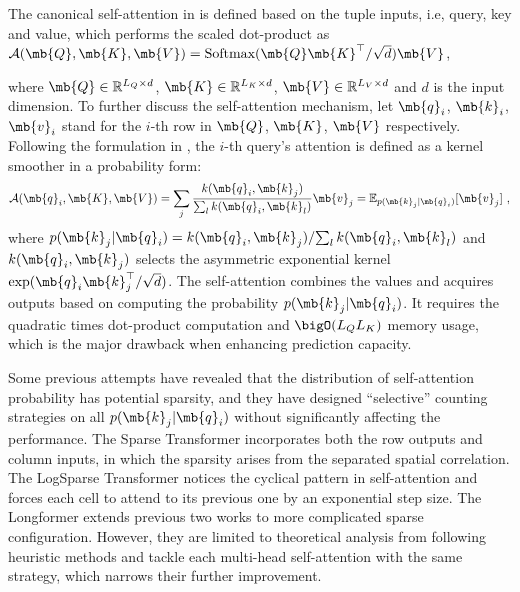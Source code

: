 The canonical self-attention in \cite{vaswani2017attention} is defined based on the tuple inputs, i.e, query, key and value, which performs the scaled dot-product as $\mathcal{A} (\mb{Q}, \mb{K}, \mb{V}) = \textrm{Softmax} ({\mb{Q}\mb{K}^{\top}}/{\sqrt{d}})\mb{V}$,
\iffalse
\begin{equation}\label{eq:method.origin.Attention}
    \mathcal{A} (\mb{Q}, \mb{K}, \mb{V}) = \textrm{Softmax} (\frac{\mb{Q}\mb{K}^{\top}}{\sqrt{d}})\mb{V} \qquad,
\end{equation}
\fi
where $\mb{Q} \in \mathbb{R}^{L_Q \times d}$, $\mb{K} \in \mathbb{R}^{L_K \times d}$, $\mb{V} \in \mathbb{R}^{L_V \times d}$ and $d$ is the input dimension.
To further discuss the self-attention mechanism, let $\mb{q}_{i}$, $\mb{k}_{i}$, $\mb{v}_{i}$ stand for the $i$-th row in $\mb{Q}$, $\mb{K}$, $\mb{V}$ respectively. Following the formulation in \cite{tsai2019transformer}, the $i$-th query's attention is defined as a kernel smoother in a probability form:
\begin{equation}\label{eq:method.prob.Attention}
    \mathcal{A} (\mb{q}_i, \mb{K}, \mb{V}) = \sum_{j} \frac{k(\mb{q}_i, \mb{k}_j)}{\sum_{l} k(\mb{q}_i, \mb{k}_l)} \mb{v}_{j} = \mathbb{E}_{p(\mb{k}_j|\mb{q}_i)} [\mb{v}_j] ~,
\end{equation}
where $p(\mb{k}_j|\mb{q}_i) = {k(\mb{q}_i, \mb{k}_j)}/{\sum_{l} k(\mb{q}_i, \mb{k}_l)}$ and $k(\mb{q}_i, \mb{k}_j)$ selects the asymmetric
exponential kernel $\exp ({\mb{q}_i \mb{k}_j^{\top}}/{\sqrt{d}})$.
The self-attention combines the values and acquires outputs based on computing the probability $p(\mb{k}_j|\mb{q}_i)$. It requires the quadratic times dot-product computation and $\bigO(L_Q L_K)$ memory usage, which is the major drawback when enhancing prediction capacity.

Some previous attempts have revealed that the distribution of self-attention probability has potential sparsity, and they have designed ``selective'' counting strategies on all $p(\mb{k}_j|\mb{q}_i)$ without significantly affecting the performance.
The Sparse Transformer \cite{child2019generating} incorporates both the row outputs and column inputs, in which the sparsity arises from the separated spatial correlation. The LogSparse Transformer \cite{li2019enhancing} notices the cyclical pattern in self-attention and forces each cell to attend to its previous one by an exponential step size.
The Longformer \cite{DBLP:journals/corr/abs-2004-05150} extends previous two works to more complicated sparse configuration.
However, they are limited to theoretical analysis from following heuristic methods and tackle each multi-head self-attention with the same strategy, which narrows their further improvement.

